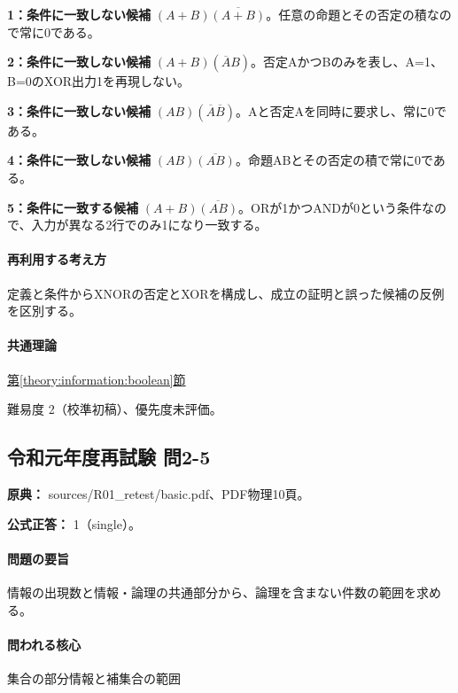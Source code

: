\noindent\textbf{1：条件に一致しない候補} \((A+B)\overline{(A+B)}\)。任意の命題とその否定の積なので常に0である。\par

\noindent\textbf{2：条件に一致しない候補} \((A+B)(\overline A B)\)。否定AかつBのみを表し、A=\allowbreak{}1、B=\allowbreak{}0のXOR出力1を再現しない。\par

\noindent\textbf{3：条件に一致しない候補} \((AB)(\overline A\overline B)\)。Aと否定Aを同時に要求し、常に0である。\par

\noindent\textbf{4：条件に一致しない候補} \((AB)\overline{(AB)}\)。命題ABとその否定の積で常に0である。\par

\noindent\textbf{5：条件に一致する候補} \((A+B)\overline{(AB)}\)。ORが1かつANDが0という条件なので、入力が異なる2行でのみ1になり一致する。\par

\paragraph{再利用する考え方} 定義と条件からXNORの否定とXORを構成し、成立の証明と誤った候補の反例を区別する。

\paragraph{共通理論} \hyperref[theory:information:boolean]{第\ref*{theory:information:boolean}節}

\par 難易度 2（校準初稿）、優先度未評価。

\subsection{令和元年度再試験 問2-5}
\label{q:r01-ret-basic-2-5}

\noindent\textbf{原典：} sources/R01\_retest/basic.pdf、PDF物理10頁。

\textbf{公式正答：} 1（single）。

\paragraph{問題の要旨} 情報の出現数と情報・論理の共通部分から、論理を含まない件数の範囲を求める。

\paragraph{問われる核心} 集合の部分情報と補集合の範囲

